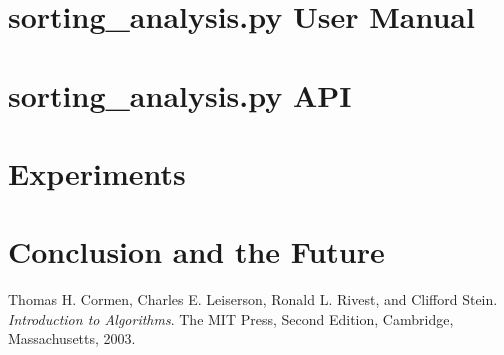 \documentclass[refman]{scrartcl}
\begin{document}

\newpage
%

%

%

%
%
%
\section{sorting\_analysis.py User Manual}

\section{sorting\_analysis.py API}

\section{Experiments}
\section{Conclusion and the Future}
\newpage
\begin{thebibliography}{9}
        Thomas H. Cormen, Charles E. Leiserson, Ronald L. Rivest, and Clifford Stein. 
        \textit{Introduction to Algorithms}. 
        The MIT Press, Second Edition, Cambridge, Massachusetts, 2003.
%
\end{thebibliography}
\end{document}
